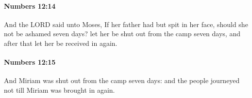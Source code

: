 		\paragraph{Numbers 12:14} %
			\label{NUMBERS-12-14}

			And the LORD said unto Moses, If her father had but spit in her face, should she not be ashamed seven days? let her be shut out from the camp seven days, and after that let her be received in again.


		\paragraph{Numbers 12:15} %
			\label{NUMBERS-12-15}

			And Miriam was shut out from the camp seven days: and the people journeyed not till Miriam was brought in again.


